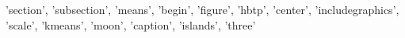 {'section', 'subsection', 'means', 'begin', 'figure', 'hbtp', 'center', 'includegraphics', 'scale', 'kmeans', 'moon', 'caption', 'islands', 'three'}

